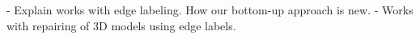 - Explain works with edge labeling. How our bottom-up approach is new. 
- Works with repairing of 3D models using edge labels. 
